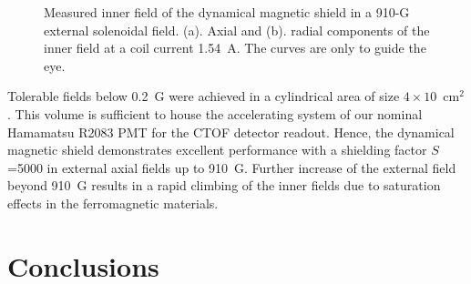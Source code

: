 \documentclass[12pt]{article}
\begin{document}
\begin{figure}[htbp]
\centering
{}
\qquad
{}
\caption{Measured inner field of the dynamical magnetic shield in a 910-G external 
solenoidal field. (a). Axial and (b). radial components of the inner field at a 
coil current 1.54~A. The curves are only to guide the eye.}
\label{innergauss}
\end{figure}

Tolerable fields below 0.2~G were achieved in a cylindrical area of size
$4 \times 10$~cm$^2$.  This volume is sufficient to house the accelerating system 
of our nominal Hamamatsu R2083 PMT for the CTOF detector readout. Hence, the 
dynamical magnetic shield demonstrates excellent performance with a shielding factor 
$S$=5000 in external axial fields up to 910~G. Further increase of the external
field beyond 910~G results in a rapid climbing of the inner fields due to saturation 
effects in the ferromagnetic materials.

\section{Conclusions}
\label{sec:concl}
\end{document}
